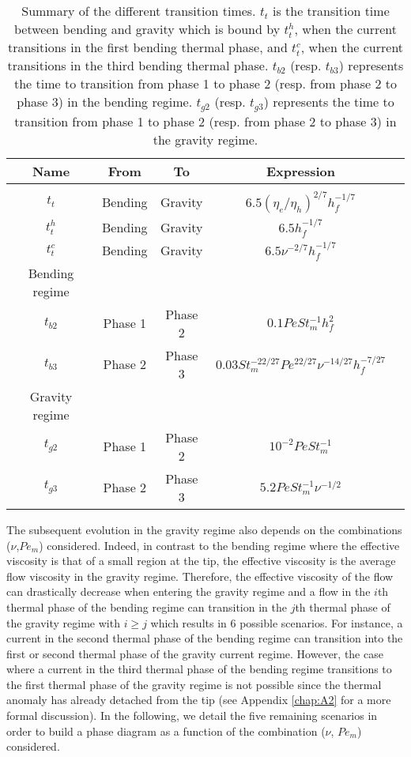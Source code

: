 \begin{table}
  \begin{center}
    \begin{tabular}{c|cc|cc}
      Name&From&To&Expression\\
      \hline
          &&&\\

      $t_t$&Bending&Gravity&$6.5(\eta_e/\eta_h)^{2/7}h_f^{-1/7}$\\
      $t_t^h$&Bending&Gravity&$6.5h_f^{-1/7}$\\
      $t_t^c$&Bending&Gravity&$6.5\nu^{-2/7}h_f^{-1/7}$\\
      Bending regime&\multicolumn{3}{c}{} \\
      $t_{b2}$&Phase 1& Phase 2&$0.1Pe St_m^{-1} h_f^2$\\
      $t_{b3}$&Phase 2& Phase 3 &$0.03 St_m^{-22/27}Pe^{22/27}\nu^{-14/27}h_f^{-7/27}$\\
      Gravity regime&\multicolumn{3}{c}{} \\
      $t_{g2}$ &Phase 1& Phase 2 &$10^{-2}PeSt_m^{-1}$\\
      $t_{g3}$ &Phase 2& Phase 3 &$ 5.2Pe St_m^{-1}\nu^{-1/2}$\\
    \end{tabular}
    \caption{Summary of the different  transition times.  $t_t$ is the
      transition time  between bending and  gravity which is  bound by
      $t_t^h$,  when  the current  transitions  in  the first  bending
      thermal phase, and $t_t^c$, when  the current transitions in the
      third  bending   thermal  phase.   $t_{b2}$   (resp.   $t_{b3}$)
      represents  the time  to  transition  from phase  1  to phase  2
      (resp. from phase 2 to phase  3) in the bending regime. $t_{g2}$
      (resp. $t_{g3}$) represents the time  to transition from phase 1
      to  phase 2  (resp. from  phase  2 to  phase 3)  in the  gravity
      regime. }
    \label{C3-tab:TimeTransition}
  \end{center}
\end{table}
The subsequent  evolution in  the gravity regime  also depends  on the
combinations ($\nu$,$Pe_m$)  considered.  Indeed,  in contrast  to the
bending regime where the effective viscosity is that of a small region
at the tip,  the effective viscosity is the average  flow viscosity in
the gravity  regime.  Therefore, the  effective viscosity of  the flow
can drastically decrease  when entering the gravity regime  and a flow
in the $i$th thermal phase of the bending regime can transition in the
$j$th thermal phase of the gravity  regime with $i\ge j$ which results
in  $6$ possible  scenarios.  For  instance, a  current in  the second
thermal phase of  the bending regime can transition into  the first or
second thermal phase of the  gravity current regime. However, the case
where  a current  in the  third thermal  phase of  the bending  regime
transitions to  the first thermal phase  of the gravity regime  is not
possible since the  thermal anomaly has already detached  from the tip
(see Appendix \ref{chap:A2} for a more formal discussion).  In
the  following, we  detail the  five remaining  scenarios in  order to
build a phase diagram as a function of the combination ($\nu$, $Pe_m$)
considered.


